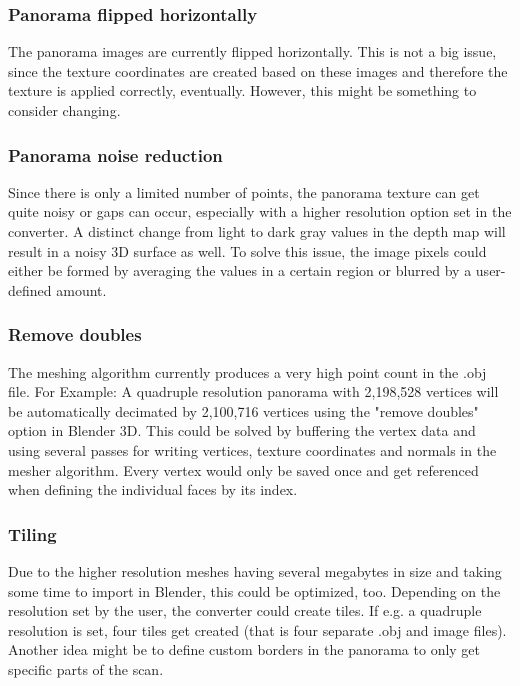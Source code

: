 \subsubsection{Panorama flipped horizontally}

The panorama images are currently flipped horizontally. This is not a big issue, since the texture coordinates are created based on these images and therefore the texture is applied correctly, eventually. However, this might be something to consider changing.

\subsubsection{Panorama noise reduction}

Since there is only a limited number of points, the panorama texture can get quite noisy or gaps can occur, especially with a higher resolution option set in the converter. A distinct change from light to dark gray values in the depth map will result in a noisy 3D surface as well.
To solve this issue, the image pixels could either be formed by averaging the values in a certain region or blurred by a user-defined amount.

\subsubsection{Remove doubles}

The meshing algorithm currently produces a very high point count in the .obj file. For Example: A quadruple resolution panorama with 2,198,528 vertices will be automatically decimated by 2,100,716 vertices using the "remove doubles" option in Blender 3D.
This could be solved by buffering the vertex data and using several passes for writing vertices, texture coordinates and normals in the mesher algorithm. Every vertex would only be saved once and get referenced when defining the individual faces by its index.

\subsubsection{Tiling}

Due to the higher resolution meshes having several megabytes in size and taking some time to import in Blender, this could be optimized, too.
Depending on the resolution set by the user, the converter could create tiles. If e.g. a quadruple resolution is set, four tiles get created (that is four separate .obj and image files). Another idea might be to define custom borders in the panorama to only get specific parts of the scan.

